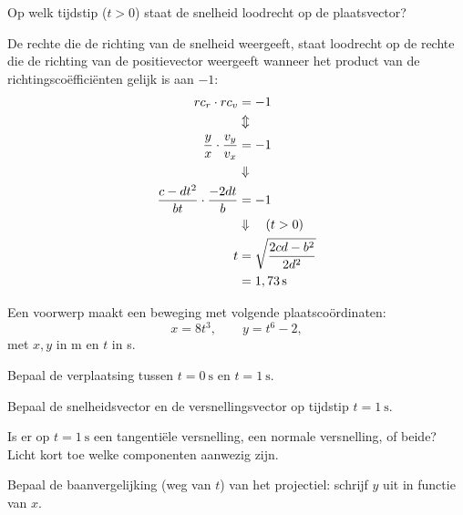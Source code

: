 \documentclass{ximera}
\begin{document}
\begin{exercise}
	\begin{question}
	Op welk tijdstip ($t>0$) staat de snelheid loodrecht op de plaatsvector?
	
	\begin{oplossing}
	De rechte die de richting van de snelheid weergeeft, staat loodrecht op de rechte die de richting van de positievector weergeeft wanneer het product van de richtingsco\"effici\"enten gelijk is aan $-1$:
	\begin{align*}
	rc_{r}\cdot rc_{v}&=-1\\
	&\Updownarrow\\
	\frac{y}{x}\cdot\frac{v_y}{v_x}&=-1\\
	&\Downarrow\\
	\frac{c-dt^2}{bt}\cdot\frac{-2dt}{b}&=-1\\
	&\Downarrow \quad (t>0)\\
	t&=\sqrt{\frac{2cd-b^2}{2d^2}}\\
	&=1,73\rm\,s
	\end{align*}
	\end{oplossing}
	\end{question}
	
	\end{exercise}
	


\begin{exercise}
	Een voorwerp maakt een beweging met volgende plaatscoördinaten:
	\[
	x=8t^{3},\qquad y=t^{6}-2,
	\]
	met \(x,y\) in \si{\meter} en \(t\) in \si{\second}.
	
	\begin{question}
	Bepaal de verplaatsing tussen \(t=\SI{0}{\second}\) en \(t=\SI{1}{\second}\).
	\end{question}
	
	\begin{question}
	Bepaal de snelheidsvector en de versnellingsvector op tijdstip \(t=\SI{1}{\second}\).
	\end{question}
	
	\begin{question}
	Is er op \(t=\SI{1}{\second}\) een tangentiële versnelling, een normale versnelling, of beide? Licht kort toe welke componenten aanwezig zijn.
	\end{question}
	
	\begin{question}
	Bepaal de baanvergelijking (weg van \(t\)) van het projectiel: schrijf \(y\) uit in functie van \(x\).
	\end{question}
	
	\end{exercise}
		
\end{document}
